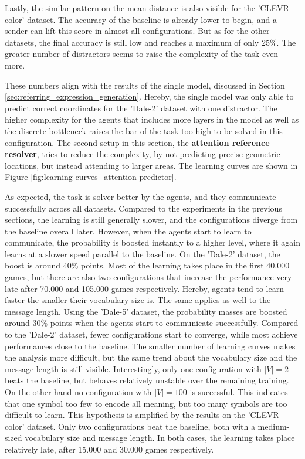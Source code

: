 Lastly, the similar pattern on the mean distance is also visible for the 'CLEVR color' dataset.
The accuracy of the baseline is already lower to begin, and a sender can lift this score in almost all configurations.
But as for the other datasets, the final accuracy is still low and reaches a maximum of only 25\%.
The greater number of distractors seems to raise the complexity of the task even more.

These numbers align with the results of the single model, discussed in Section \ref{sec:referring_expression_generation}.
Hereby, the single model was only able to predict correct coordinates for the 'Dale-2' dataset with one distractor.
The higher complexity for the agents that includes more layers in the model as well as the discrete bottleneck raises the bar of the task too high to be solved in this configuration.
The second setup in this section, the \textbf{attention reference resolver}, tries to reduce the complexity, by not predicting precise geometric locations, but instead attending to larger areas.
The learning curves are shown in Figure \ref{fig:learning-curves_attention-predictor}.

As expected, the task is solver better by the agents, and they communicate successfully across all datasets.
Compared to the experiments in the previous sections, the learning is still generally slower, and the configurations diverge from the baseline overall later.
However, when the agents start to learn to communicate, the probability is boosted instantly to a higher level, where it again learns at a slower speed parallel to the baseline.
On the 'Dale-2' dataset, the boost is around 40\% points.
Most of the learning takes place in the first 40.000 games, but there are also two configurations that increase the performance very late after 70.000 and 105.000 games respectively.
Hereby, agents tend to learn faster the smaller their vocabulary size is.
The same applies as well to the message length.
Using the 'Dale-5' dataset, the probability masses are boosted around 30\% points when the agents start to communicate successfully.
Compared to the 'Dale-2' dataset, fewer configurations start to converge, while most achieve performances close to the baseline.
The smaller number of learning curves makes the analysis more difficult, but the same trend about the vocabulary size and the message length is still visible.
Interestingly, only one configuration with $|V|=2$ beats the baseline, but behaves relatively unstable over the remaining training.
On the other hand no configuration with $|V|=100$ is successful.
This indicates that one symbol too few to encode all meaning, but too many symbols are too difficult to learn.
This hypothesis is amplified by the results on the 'CLEVR color' dataset.
Only two configurations beat the baseline, both with a medium-sized vocabulary size and message length.
In both cases, the learning takes place relatively late, after 15.000 and 30.000 games respectively.

